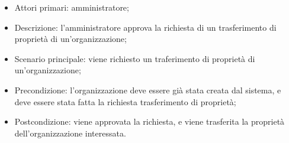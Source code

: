 \begin{itemize}
\item Attori primari: amministratore;
\item Descrizione: l'amministratore approva la richiesta di un trasferimento di proprietà di un'organizzazione;
\item Scenario principale: viene richiesto un traferimento di proprietà di un'organizzazione;
\item Precondizione: l'organizzazione deve essere già stata creata dal sistema, e deve essere stata fatta la richiesta trasferimento di proprietà;
\item Postcondizione: viene approvata la richiesta, e viene trasferita la proprietà dell'organizzazione interessata.

\end{itemize}